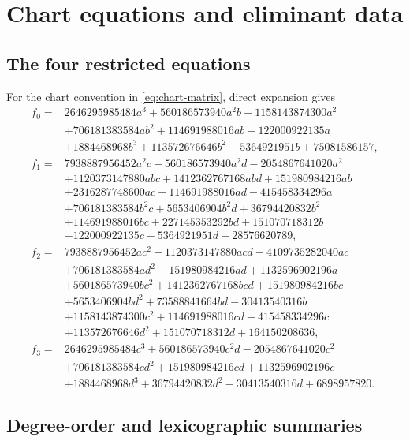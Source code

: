 \section{Chart equations and eliminant data}
\label{app:chart-data}

\subsection{The four restricted equations}

For the chart convention in \cref{eq:chart-matrix}, direct expansion gives
\begin{align*}
f_0={}&2646295985484a^3+560186573940a^2b+1158143874300a^2\\
&+706181383584ab^2+114691988016ab-122000922135a\\
&+1884468968b^3+113572676646b^2-5364921951b+75081586157,\\[2pt]
f_1={}&7938887956452a^2c+560186573940a^2d-2054867641020a^2\\
&+1120373147880abc+1412362767168abd+151980984216ab\\
&+2316287748600ac+114691988016ad-415458334296a\\
&+706181383584b^2c+5653406904b^2d+36794420832b^2\\
&+114691988016bc+227145353292bd+151070718312b\\
&-122000922135c-5364921951d-28576620789,\\[2pt]
f_2={}&7938887956452ac^2+1120373147880acd-4109735282040ac\\
&+706181383584ad^2+151980984216ad+1132596902196a\\
&+560186573940bc^2+1412362767168bcd+151980984216bc\\
&+5653406904bd^2+73588841664bd-30413540316b\\
&+1158143874300c^2+114691988016cd-415458334296c\\
&+113572676646d^2+151070718312d+164150208636,\\[2pt]
f_3={}&2646295985484c^3+560186573940c^2d-2054867641020c^2\\
&+706181383584cd^2+151980984216cd+1132596902196c\\
&+1884468968d^3+36794420832d^2-30413540316d+6898957820.
\end{align*}

\subsection{Degree-order and lexicographic summaries}

